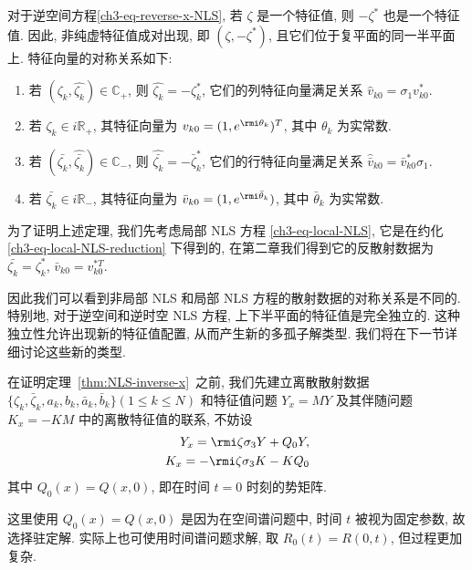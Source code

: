 \begin{theorem} \label{thm:NLS-inverse-x}
    对于逆空间方程\eqref{ch3-eq-reverse-x-NLS}, 若 $ \zeta $ 是一个特征值, 则 $ -\zeta^{*} $ 也是一个特征值. 因此, 非纯虚特征值成对出现, 即 $(\zeta, -\zeta^{*})$, 且它们位于复平面的同一半平面上. 特征向量的对称关系如下:
    \begin{enumerate}
        \item 若 $ (\zeta_{k}, \hat{\zeta_{k}}) \in \mathbb{C_{+}}$, 则 $\hat{\zeta_{k}} = - \zeta^{*}_{k} $, 它们的列特征向量满足关系 $\hat{v}_{k0} = \sigma_{1} v_{k0}^{*}$.
        \item 若 $ \zeta_{k} \in i\mathbb{R}_{+} $, 其特征向量为 $v_{k0} = (1, e^{\rmi\theta_{k}})^{T} $, 其中 $ \theta_{k} $ 为实常数.
        \item 若 $ (\bar{\zeta_{k}}, \hat{\bar{\zeta_{k}}}) \in \mathbb{C_{-}} $, 则 $\hat{\bar{\zeta_{k}}} = - \bar{\zeta}^{*}_{k} $, 它们的行特征向量满足关系 $\hat{\bar{v}}_{k0} = \bar{v}_{k0}^{*} \sigma_{1}$.
        \item 若 $ \bar{\zeta_{k}} \in i\mathbb{R}_{-} $, 其特征向量为 $\bar{v}_{k0} = (1 ,e^{\rmi\bar{\theta}_{k}})$, 其中 $ \bar{\theta}_{k} $ 为实常数.
    \end{enumerate}
\end{theorem}
为了证明上述定理, 我们先考虑局部 NLS 方程 \eqref{ch3-eq-local-NLS}, 它是在约化 \eqref{ch3-eq-local-NLS-reduction} 下得到的, 在第二章我们得到它的反散射数据为 $ \bar{\zeta_{k}} = \zeta^{*}_{k} $, $\bar{v}_{k0} = v_{k0}^{*T} $.

因此我们可以看到非局部 NLS 和局部 NLS 方程的散射数据的对称关系是不同的. 特别地, 对于逆空间和逆时空 NLS 方程, 上下半平面的特征值是完全独立的. 这种独立性允许出现新的特征值配置, 从而产生新的多孤子解类型. 我们将在下一节详细讨论这些新的类型.

在证明定理~\ref{thm:NLS-inverse-x}~之前, 我们先建立离散散射数据 $ \{\zeta_{k}, \bar{\zeta}_{k}, a_{k}, b_{k}, \bar{a}_{k}, \bar{b}_{k}\}(1\leq k \leq N) $ 和特征值问题 $ Y_{x} = MY $ 及其伴随问题 $ K_{x} = -KM $ 中的离散特征值的联系, 不妨设
\begin{align}
    Y_{x} = \rmi \zeta \sigma_{3} Y + Q_{0} Y, \label{ch3-eq-reverse-x-NLS-eigenvalue} \\
    K_{x} = -\rmi \zeta \sigma_{3} K - K Q_{0} \label{ch3-eq-reverse-x-NLS-adjoint-eigenvalue}
\end{align}
其中 $ Q_{0}(x) = Q(x,0) $, 即在时间 $ t = 0 $ 时刻的势矩阵.

\begin{remark}
    这里使用 $ Q_{0}(x) = Q(x,0) $ 是因为在空间谱问题中, 时间 $t$ 被视为固定参数, 故选择驻定解. 实际上也可使用时间谱问题求解, 取 $R_{0}(t) = R(0,t)$, 但过程更加复杂.
\end{remark}

